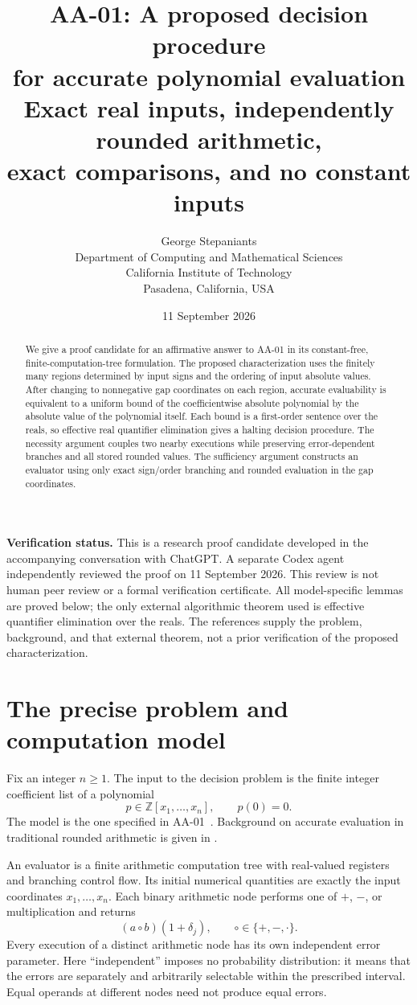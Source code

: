 \documentclass[11pt,a4paper]{article}
\title{\textbf{AA-01: A proposed decision procedure\\
for accurate polynomial evaluation}\\[0.5em]
\large Exact real inputs, independently rounded arithmetic,\\
exact comparisons, and no constant inputs}
\author{George Stepaniants\\[0.3em]
\small Department of Computing and Mathematical Sciences\\
\small California Institute of Technology\\
\small Pasadena, California, USA}
\date{11 September 2026}
\numberwithin{equation}{section}
\theoremstyle{definition}
\theoremstyle{remark}
\newcommand{\Z}{\mathbb Z}
\begin{document}
\maketitle
\thispagestyle{plain}

\begin{abstract}
We give a proof candidate for an affirmative answer to AA-01 in its
constant-free, finite-computation-tree formulation.  The proposed
characterization uses the finitely many regions determined by input signs
and the ordering of input absolute values.  After changing to nonnegative
gap coordinates on each region, accurate evaluability is equivalent to a
uniform bound of the coefficientwise absolute polynomial by the absolute
value of the polynomial itself.  Each bound is a first-order sentence over
the reals, so effective real quantifier elimination gives a halting
decision procedure.  The necessity argument couples two nearby executions
while preserving error-dependent branches and all stored rounded values.
The sufficiency argument constructs an evaluator using only exact
sign/order branching and rounded evaluation in the gap coordinates.
\end{abstract}

\noindent\textbf{Verification status.}
This is a research proof candidate developed in the accompanying
conversation with ChatGPT.  A separate Codex agent independently reviewed
the proof on 11 September 2026.  This review is not human peer review or
a formal verification certificate.  All model-specific lemmas are proved below; the only external
algorithmic theorem used is effective quantifier elimination over the
reals.  The references supply the problem, background, and that external
theorem, not a prior verification of the proposed characterization.

\section{The precise problem and computation model}\label{sec:model}

Fix an integer $n\ge1$.  The input to the decision problem is the finite
integer coefficient list of a polynomial
\[
 p\in\Z[x_1,\ldots,x_n],\qquad p(0)=0.
\]
The model is the one specified in AA-01~\cite{AA01}.  Background on accurate
evaluation in traditional rounded arithmetic is given in
\cite{DDH06,DDHK08}.

An evaluator is a finite arithmetic computation tree with real-valued
registers and branching control flow.  Its initial numerical quantities
are exactly the input coordinates $x_1,\ldots,x_n$.  Each binary arithmetic
node performs one of $+$, $-$, or multiplication and returns
\begin{equation}\label{eq:rounding}
 (a\circ b)(1+\delta_j),\qquad \circ\in\{+,-,\cdot\}.
\end{equation}
Every execution of a distinct arithmetic node has its own independent
error parameter.  Here ``independent'' imposes no probability distribution:
it means that the errors are separately and arbitrarily selectable within
the prescribed interval.  Equal operands at different nodes need not
produce equal errors.
\end{document}
